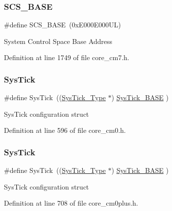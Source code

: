 \subsubsection{\texorpdfstring{S\+C\+S\+\_\+\+B\+A\+SE}{SCS\_BASE}\hspace{0.1cm}{\footnotesize\ttfamily [7/7]}}
{\footnotesize\ttfamily \#define S\+C\+S\+\_\+\+B\+A\+SE~(0x\+E000\+E000\+U\+L)}

System Control Space Base Address 

Definition at line 1749 of file core\+\_\+cm7.\+h.

\mbox{\label{group___c_m_s_i_s__core__base_gacd96c53beeaff8f603fcda425eb295de}} 
\subsubsection{\texorpdfstring{Sys\+Tick}{SysTick}\hspace{0.1cm}{\footnotesize\ttfamily [1/7]}}
{\footnotesize\ttfamily \#define Sys\+Tick~((\hyperlink{struct_sys_tick___type}{Sys\+Tick\+\_\+\+Type}   $\ast$)     \hyperlink{group___c_m_s_i_s__core__base_ga58effaac0b93006b756d33209e814646}{Sys\+Tick\+\_\+\+B\+A\+SE}  )}

Sys\+Tick configuration struct 

Definition at line 596 of file core\+\_\+cm0.\+h.

\mbox{\label{group___c_m_s_i_s__core__base_gacd96c53beeaff8f603fcda425eb295de}} 
\subsubsection{\texorpdfstring{Sys\+Tick}{SysTick}\hspace{0.1cm}{\footnotesize\ttfamily [2/7]}}
{\footnotesize\ttfamily \#define Sys\+Tick~((\hyperlink{struct_sys_tick___type}{Sys\+Tick\+\_\+\+Type}   $\ast$)     \hyperlink{group___c_m_s_i_s__core__base_ga58effaac0b93006b756d33209e814646}{Sys\+Tick\+\_\+\+B\+A\+SE}  )}

Sys\+Tick configuration struct 

Definition at line 708 of file core\+\_\+cm0plus.\+h.

